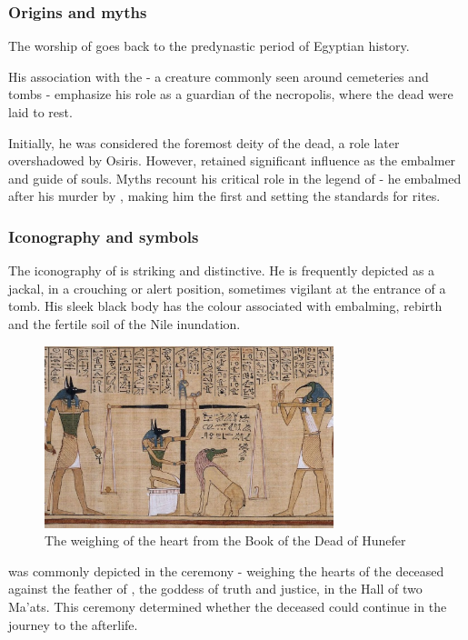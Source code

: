 \subsubsection*{Origins and myths}
The worship of  goes back to the predynastic period of Egyptian history.

His association with the  - a creature commonly seen around cemeteries and tombs - emphasize his role as a guardian of the necropolis, where the dead were laid to rest.

Initially, he was considered the foremost deity of the dead, a role later overshadowed by Osiris. However,  retained significant influence as the embalmer and guide of souls. Myths recount his critical role in the legend of  - he embalmed  after his murder by , making him the first  and setting the standards for  rites.

\subsubsection*{Iconography and symbols}
The iconography of  is striking and distinctive. He is frequently depicted as a jackal, in a crouching or alert position, sometimes vigilant at the entrance of a tomb. His sleek black body has the colour associated with embalming, rebirth and the fertile soil of the Nile inundation.

\begin{figure} [H]
	\centering
	\includegraphics[width=0.75\textwidth]{../photos/Anubis_Hunefer}
	\caption{The weighing of the heart from the Book of the Dead of Hunefer}
\end{figure}

 was commonly depicted in the  ceremony - weighing the hearts of the deceased against the feather of , the goddess of truth and justice, in the Hall of two Ma'ats. This ceremony determined whether the deceased could continue in the journey to the afterlife.

